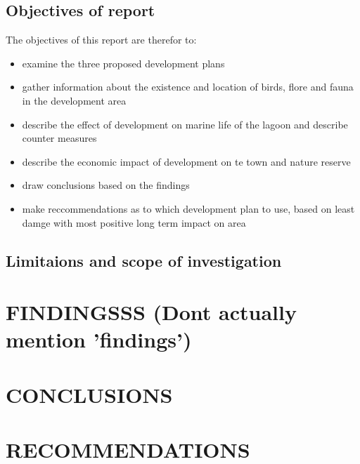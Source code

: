 \documentclass{article}
\begin{document}
\subsection{Objectives of report}
The objectives of this report are therefor to:
\begin{itemize}
	\item examine the three proposed development plans
	\item gather information about the existence and location of birds, flore and fauna in the development area
	\item describe the effect of development on marine life of the lagoon and describe counter measures
	\item describe the economic impact of development on te town and nature reserve
	\item draw conclusions based on the findings
	\item make reccommendations as to which development plan to use, based on least damge with most positive long term impact on area
\end{itemize}

\subsection{Limitaions and scope of investigation}


\newpage
\section{FINDINGSSS (Dont actually mention 'findings')}

\newpage
\section{CONCLUSIONS}

\newpage
\section{RECOMMENDATIONS}

\newpage
\printbibliography
\end{document}
